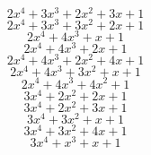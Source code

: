 \documentclass{article}
\begin{document}
\vspace{-\bigskipamount}
\begin{dmath*}
2 x^{4}+3 x^{3}+2 x^{2}+3 x +1
\end{dmath*}
\vspace{-\bigskipamount}
\begin{dmath*}
2 x^{4}+3 x^{3}+3 x^{2}+2 x +1
\end{dmath*}
\vspace{-\bigskipamount}
\begin{dmath*}
2 x^{4}+4 x^{3}+x +1
\end{dmath*}
\vspace{-\bigskipamount}
\begin{dmath*}
2 x^{4}+4 x^{3}+2 x +1
\end{dmath*}
\vspace{-\bigskipamount}
\begin{dmath*}
2 x^{4}+4 x^{3}+2 x^{2}+4 x +1
\end{dmath*}
\vspace{-\bigskipamount}
\begin{dmath*}
2 x^{4}+4 x^{3}+3 x^{2}+x +1
\end{dmath*}
\vspace{-\bigskipamount}
\begin{dmath*}
2 x^{4}+4 x^{3}+4 x^{2}+1
\end{dmath*}
\vspace{-\bigskipamount}
\begin{dmath*}
3 x^{4}+2 x^{2}+2 x +1
\end{dmath*}
\vspace{-\bigskipamount}
\begin{dmath*}
3 x^{4}+2 x^{2}+3 x +1
\end{dmath*}
\vspace{-\bigskipamount}
\begin{dmath*}
3 x^{4}+3 x^{2}+x +1
\end{dmath*}
\vspace{-\bigskipamount}
\begin{dmath*}
3 x^{4}+3 x^{2}+4 x +1
\end{dmath*}
\vspace{-\bigskipamount}
\begin{dmath*}
3 x^{4}+x^{3}+x +1
\end{dmath*}
\vspace{-\bigskipamount}
\end{document}
